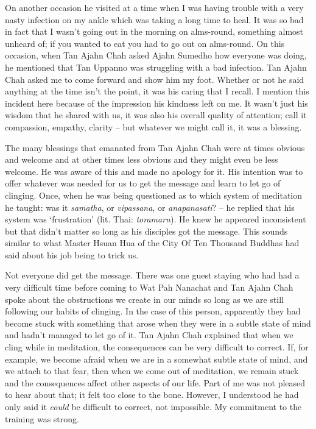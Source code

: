 On another occasion he visited at a time when I was having trouble with
a very nasty infection on my ankle which was taking a long time to heal.
It was so bad in fact that I wasn't going out in the morning on
alms-round, something almost unheard of; if you wanted to eat you had to
go out on alms-round. On this occasion, when Tan Ajahn Chah asked Ajahn
Sumedho how everyone was doing, he mentioned that Tan Uppanno was
struggling with a bad infection. Tan Ajahn Chah asked me to come forward
and show him my foot. Whether or not he said anything at the time isn't
the point, it was his caring that I recall. I mention this incident here
because of the impression his kindness left on me. It wasn't just his
wisdom that he shared with us, it was also his overall quality of
attention; call it compassion, empathy, clarity -- but whatever we might
call it, it was a blessing.

The many blessings that emanated from Tan Ajahn Chah were at times
obvious and welcome and at other times less obvious and they might even
be less welcome. He was aware of this and made no apology for it. His
intention was to offer whatever was needed for us to get the message and
learn to let go of clinging. Once, when he was being questioned as to
which system of meditation he taught: was it \emph{samatha}, or
\emph{vipassana}, or \emph{anapanasati}? -- he replied that his system
was `frustration' (lit. Thai: \emph{toramarn}). He knew he appeared
inconsistent but that didn't matter so long as his disciples got the
message. This sounds similar to what Master Hsuan Hua of the City Of Ten
Thousand Buddhas had said about his job being to trick us.

Not everyone did get the message. There was one guest staying who had
had a very difficult time before coming to Wat Pah Nanachat and Tan
Ajahn Chah spoke about the obstructions we create in our minds so long
as we are still following our habits of clinging. In the case of this
person, apparently they had become stuck with something that arose when
they were in a subtle state of mind and hadn't managed to let go of it.
Tan Ajahn Chah explained that when we cling while in meditation, the
consequences can be very difficult to correct. If, for example, we
become afraid when we are in a somewhat subtle state of mind, and we
attach to that fear, then when we come out of meditation, we remain
stuck and the consequences affect other aspects of our life. Part of me
was not pleased to hear about that; it felt too close to the bone.
However, I understood he had only said it \emph{could} be difficult to
correct, not impossible. My commitment to the training was strong.

